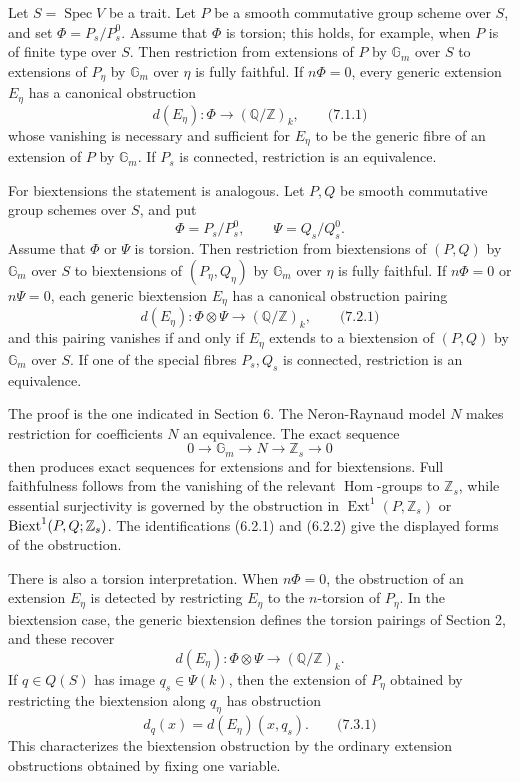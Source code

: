 \documentclass[11pt]{article}
\providecommand{\Spec}{\operatorname{Spec}}
\providecommand{\Z}{\mathbb Z}
\providecommand{\Q}{\mathbb Q}
\providecommand{\Gm}{\mathbb G_m}
\providecommand{\Hom}{\operatorname{Hom}}
\providecommand{\Ext}{\operatorname{Ext}}
\begin{document}
Let \(S=\Spec V\) be a trait.  Let \(P\) be a smooth commutative group scheme over \(S\), and set \(\Phi=P_s/P_s^0\).  Assume that \(\Phi\) is torsion; this holds, for example, when \(P\) is of finite type over \(S\).  Then restriction from extensions of \(P\) by \(\Gm\) over \(S\) to extensions of \(P_\eta\) by \(\Gm\) over \(\eta\) is fully faithful.  If \(n\Phi=0\), every generic extension \(E_\eta\) has a canonical obstruction
\[
        d(E_\eta):\Phi\longrightarrow (\Q/\Z)_k,
\qquad\text{(7.1.1)}
\]
whose vanishing is necessary and sufficient for \(E_\eta\) to be the generic fibre of an extension of \(P\) by \(\Gm\).  If \(P_s\) is connected, restriction is an equivalence.

For biextensions the statement is analogous.  Let \(P,Q\) be smooth commutative group schemes over \(S\), and put
\[
        \Phi=P_s/P_s^0,
        \qquad
        \Psi=Q_s/Q_s^0.
\]
Assume that \(\Phi\) or \(\Psi\) is torsion.  Then restriction from biextensions of \((P,Q)\) by \(\Gm\) over \(S\) to biextensions of \((P_\eta,Q_\eta)\) by \(\Gm\) over \(\eta\) is fully faithful.  If \(n\Phi=0\) or \(n\Psi=0\), each generic biextension \(E_\eta\) has a canonical obstruction pairing
\[
        d(E_\eta):\Phi\otimes \Psi\longrightarrow (\Q/\Z)_k,
\qquad\text{(7.2.1)}
\]
and this pairing vanishes if and only if \(E_\eta\) extends to a biextension of \((P,Q)\) by \(\Gm\) over \(S\).  If one of the special fibres \(P_s,Q_s\) is connected, restriction is an equivalence.

The proof is the one indicated in Section 6.  The Neron-Raynaud model \(N\) makes restriction for coefficients \(N\) an equivalence.  The exact sequence
\[
        0\to\Gm\to N\to \Z_s\to 0
\]
then produces exact sequences for extensions and for biextensions.  Full faithfulness follows from the vanishing of the relevant \(\Hom\)-groups to \(\Z_s\), while essential surjectivity is governed by the obstruction in \(\Ext^1(P,\Z_s)\) or \(\Biext^1(P,Q;\Z_s)\).  The identifications (6.2.1) and (6.2.2) give the displayed forms of the obstruction.

There is also a torsion interpretation.  When \(n\Phi=0\), the obstruction of an extension \(E_\eta\) is detected by restricting \(E_\eta\) to the \(n\)-torsion of \(P_\eta\).  In the biextension case, the generic biextension defines the torsion pairings of Section 2, and these recover
\[
        d(E_\eta):\Phi\otimes\Psi\to(\Q/\Z)_k.
\]
If \(q\in Q(S)\) has image \(q_s\in \Psi(k)\), then the extension of \(P_\eta\) obtained by restricting the biextension along \(q_\eta\) has obstruction
\[
        d_q(x)=d(E_\eta)(x,q_s).
\qquad\text{(7.3.1)}
\]
This characterizes the biextension obstruction by the ordinary extension obstructions obtained by fixing one variable.
\end{document}
